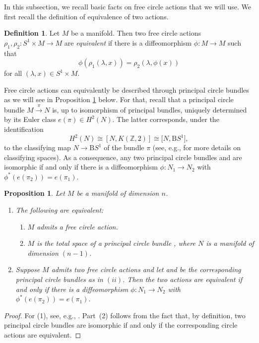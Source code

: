 \documentclass[pdftex]{sigma}
\numberwithin{equation}{section}
\newtheorem{Proposition}[Theorem]{Proposition}
\theoremstyle{definition}
\newtheorem{Definition}[Theorem]{Definition}
\numberwithin{table}{section}
\newcommand{\Z}{\mathbb{Z}}
\begin{document}
In this subsection, we recall basic facts on free circle actions that we will use. We first recall the definition of equivalence of two actions.

\begin{Definition}
	Let $M$ be a manifold. Then two free circle actions $\rho_1,\rho_2\colon S^1\times M\to M$ are \emph{equivalent} if there is a diffeomorphism $\phi\colon M\to M$ such that
	\[ \phi(\rho_1(\lambda,x))=\rho_2(\lambda,\phi(x)) \]
	for all $(\lambda,x)\in S^1\times M$.
\end{Definition}

Free circle actions can equivalently be described through principal circle bundles as we will see in Proposition \ref{P:action=bdl} below. For that, recall that a principal circle bundle $M\xrightarrow{\pi}N$ is, up to isomorphism of principal bundles, uniquely determined by its Euler class $e(\pi)\in H^2(N)$. The latter corresponds, under the identification
\[H^2(N)\cong[N,K(\Z,2)]\cong \bigl[N,\mathrm{B}S^1\bigr],\]
to the classifying map $N\to \mathrm{B}S^1$ of the bundle $\pi$ (see, e.g., \cite[Sections 4.10--4.13]{Hu94} for more details on classifying spaces). As a consequence, any two principal circle bundles  and  are isomorphic if and only if there is a diffeomorphism $\phi\colon N_1\to N_2$ with ${\phi^*(e(\pi_2))=e(\pi_1)}$.

\begin{Proposition}\label{P:action=bdl}
	Let $M$ be a manifold of dimension $n$.
	\begin{enumerate}\itemsep=0pt
		\item[$(1)$] The following are equivalent:
		\begin{enumerate}[$(i)$]\itemsep=0pt
			\item $M$ admits a free circle action.
			\item $M$ is the total space of a principal circle bundle , where $N$ is a manifold of dimension $(n-1)$.
		\end{enumerate}
		\item[$(2)$] Suppose $M$ admits two free circle actions and let  and  be the corresponding principal circle bundles as in $(ii)$. Then the two actions are equivalent if and only if there is a diffeomorphism $\phi\colon N_1\to N_2$ with $\phi^*(e(\pi_2))=e(\pi_1)$.
	\end{enumerate}
\end{Proposition}
\begin{proof}
	For (1), see, e.g., \cite[Corollary~VI.2.5]{Br72a}. Part~(2) follows from the fact that, by definition, two principal circle bundles are isomorphic if and only if the corresponding circle actions are equivalent.
\end{proof}
\end{document}
